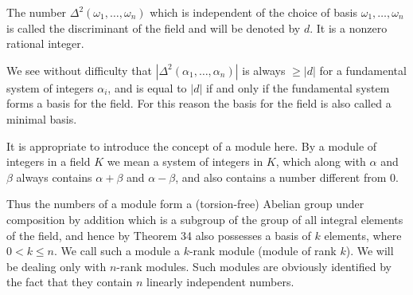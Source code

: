 The number $\Delta^2(\omega_1, \ldots, \omega_n)$ which is independent of the choice of basis $\omega_1, \ldots, \omega_n$ is called the discriminant of the field and will be denoted by $d$. It is a nonzero rational integer.

We see without difficulty that $|\Delta^2(\alpha_1, \ldots, \alpha_n)|$ is always $\geq |d|$ for a fundamental system of integers $\alpha_i$, and is equal to $|d|$ if and only if the fundamental system forms a basis for the field. For this reason the basis for the field is also called a minimal basis.

It is appropriate to introduce the concept of a module here. By a module of integers in a field $K$ we mean a system of integers in $K$, which along with $\alpha$ and $\beta$ always contains $\alpha + \beta$ and $\alpha - \beta$, and also contains a number different from 0.

Thus the numbers of a module form a (torsion-free) Abelian group under composition by addition which is a subgroup of the group of all integral elements of the field, and hence by Theorem 34 also possesses a basis of $k$ elements, where $0 < k \leq n$. We call such a module a $k$-rank module (module of rank $k$). We will be dealing only with $n$-rank modules. Such modules are obviously identified by the fact that they contain $n$ linearly independent numbers.
